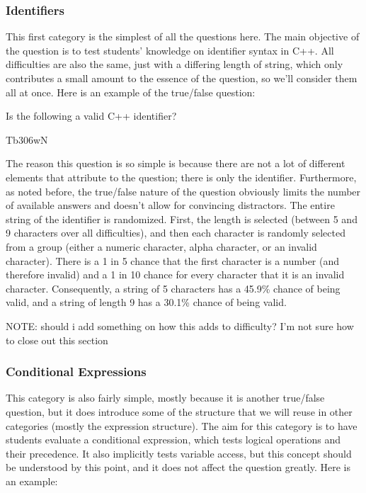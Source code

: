 \documentclass{article}
\begin{document}
\subsubsection{Identifiers}

This first category is the simplest of all the questions here. The main objective of the question is to test students' knowledge on identifier syntax in C++.
All difficulties are also the same, just with a differing length of string, which only contributes a small amount to the essence of the question, so we'll consider
them all at once.
Here is an example of the true/false question:

\hfill \par
Is the following a valid C++ identifier? \par
Tb306wN 

\hfill \par

The reason this question is so simple is because there are not a lot of different elements that attribute to the question; there is only the identifier.
Furthermore, as noted before, the true/false nature of the question obviously limits the number of available answers and doesn't allow for convincing distractors.
The entire string of the identifier is randomized. First, the length is selected (between 5 and 9 characters over all difficulties), and then each character is randomly selected from
a group (either a numeric character, alpha character, or an invalid character). There is a 1 in 5 chance that the first character is a number (and therefore invalid)
and a 1 in 10 chance for every character that it is an invalid character. Consequently, a string of 5 characters has a 45.9\% chance of being valid, and a string of
length 9 has a 30.1\% chance of being valid.

NOTE: should i add something on how this adds to difficulty? I'm not sure how to close out this section

\subsubsection{Conditional Expressions}
This category is also fairly simple, mostly because it is another true/false question, but it does introduce some of the structure that we will reuse in other
categories (mostly the expression structure). The aim for this category is to have students evaluate a conditional expression, which tests logical operations
and their precedence. It also implicitly tests variable access, but this concept should be understood by this point, and it does not affect the question greatly.
Here is an example:
\end{document}
